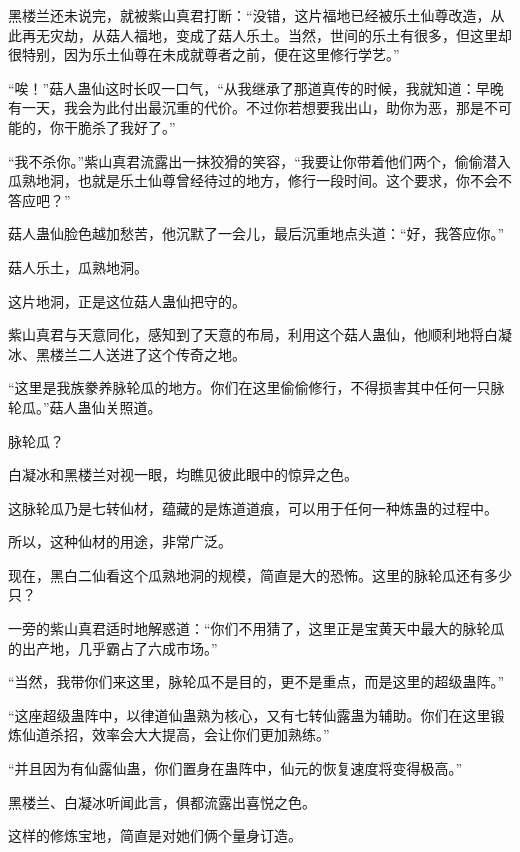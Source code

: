 
\begin{this_body}



黑楼兰还未说完，就被紫山真君打断：“没错，这片福地已经被乐土仙尊改造，从此再无灾劫，从菇人福地，变成了菇人乐土。当然，世间的乐土有很多，但这里却很特别，因为乐土仙尊在未成就尊者之前，便在这里修行学艺。”

“唉！”菇人蛊仙这时长叹一口气，“从我继承了那道真传的时候，我就知道：早晚有一天，我会为此付出最沉重的代价。不过你若想要我出山，助你为恶，那是不可能的，你干脆杀了我好了。”

“我不杀你。”紫山真君流露出一抹狡猾的笑容，“我要让你带着他们两个，偷偷潜入瓜熟地洞，也就是乐土仙尊曾经待过的地方，修行一段时间。这个要求，你不会不答应吧？”

菇人蛊仙脸色越加愁苦，他沉默了一会儿，最后沉重地点头道：“好，我答应你。”

菇人乐土，瓜熟地洞。

这片地洞，正是这位菇人蛊仙把守的。

紫山真君与天意同化，感知到了天意的布局，利用这个菇人蛊仙，他顺利地将白凝冰、黑楼兰二人送进了这个传奇之地。

“这里是我族豢养脉轮瓜的地方。你们在这里偷偷修行，不得损害其中任何一只脉轮瓜。”菇人蛊仙关照道。

脉轮瓜？

白凝冰和黑楼兰对视一眼，均瞧见彼此眼中的惊异之色。

这脉轮瓜乃是七转仙材，蕴藏的是炼道道痕，可以用于任何一种炼蛊的过程中。

所以，这种仙材的用途，非常广泛。

现在，黑白二仙看这个瓜熟地洞的规模，简直是大的恐怖。这里的脉轮瓜还有多少只？

一旁的紫山真君适时地解惑道：“你们不用猜了，这里正是宝黄天中最大的脉轮瓜的出产地，几乎霸占了六成市场。”

“当然，我带你们来这里，脉轮瓜不是目的，更不是重点，而是这里的超级蛊阵。”

“这座超级蛊阵中，以律道仙蛊熟为核心，又有七转仙露蛊为辅助。你们在这里锻炼仙道杀招，效率会大大提高，会让你们更加熟练。”

“并且因为有仙露仙蛊，你们置身在蛊阵中，仙元的恢复速度将变得极高。”

黑楼兰、白凝冰听闻此言，俱都流露出喜悦之色。

这样的修炼宝地，简直是对她们俩个量身订造。


\end{this_body}
